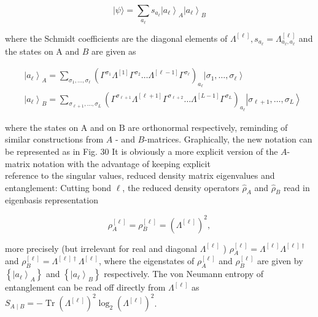 \documentclass[12pt]{article}
\begin{document}
\begin{equation*}
|\psi\rangle=\sum_{a_{\ell}} s_{a_{\ell}}\left|a_{\ell}\right\rangle_{A}\left|a_{\ell}\right\rangle_{B} \tag{157}
\end{equation*}


where the Schmidt coefficients are the diagonal elements of $\Lambda^{[\ell]}, s_{a_{\ell}}=\Lambda_{a_{\ell}, a_{\ell}}^{[\ell]}$ and the states on $\mathrm{A}$ and $B$ are given as


\begin{align*}
& \left|a_{\ell}\right\rangle_{A}=\sum_{\sigma_{1}, \ldots, \sigma_{\ell}}\left(\Gamma^{\sigma_{1}} \Lambda^{[1]} \Gamma^{\sigma_{2}} \ldots \Lambda^{[\ell-1]} \Gamma^{\sigma_{\ell}}\right)_{a_{\ell}}\left|\sigma_{1}, \ldots, \sigma_{\ell}\right\rangle  \tag{158}\\
& \left|a_{\ell}\right\rangle_{B}=\sum_{\sigma_{\ell+1}, \ldots, \sigma_{L}}\left(\Gamma^{\sigma_{\ell+1}} \Lambda^{[\ell+1]} \Gamma^{\sigma_{\ell+2}} \ldots \Lambda^{[L-1]} \Gamma^{\sigma_{L}}\right)_{a_{\ell}}\left|\sigma_{\ell+1}, \ldots, \sigma_{L}\right\rangle \tag{159}
\end{align*}


where the states on $\mathrm{A}$ and on $\mathrm{B}$ are orthonormal respectively, reminding of similar constructions from $A$ - and $B$-matrices. Graphically, the new notation can be represented as in Fig. 30 It is obviously a more explicit version of the $A$-matrix notation with the advantage of keeping explicit\\
reference to the singular values, reduced density matrix eigenvalues and entanglement: Cutting bond $\ell$, the reduced density operators $\hat{\rho}_{A}$ and $\hat{\rho}_{B}$ read in eigenbasis representation


\begin{equation*}
\rho_{A}^{[\ell]}=\rho_{B}^{[\ell]}=\left(\Lambda^{[\ell]}\right)^{2}, \tag{160}
\end{equation*}


more precisely (but irrelevant for real and diagonal $\Lambda^{[\ell]}$ ) $\rho_{A}^{[\ell]}=\Lambda^{[\ell]} \Lambda^{[\ell] \dagger}$ and $\rho_{B}^{[\ell]}=\Lambda^{[\ell] \dagger} \Lambda^{[\ell]}$, where the eigenstates of $\rho_{A}^{[\ell]}$ and $\rho_{B}^{[\ell]}$ are given by $\left\{\left|a_{\ell}\right\rangle_{A}\right\}$ and $\left\{\left|a_{\ell}\right\rangle_{B}\right\}$ respectively. The von Neumann entropy of entanglement can be read off directly from $\Lambda^{[\ell]}$ as $S_{A \mid B}=-\operatorname{Tr}\left(\Lambda^{[\ell]}\right)^{2} \log _{2}\left(\Lambda^{[\ell]}\right)^{2}$.
\end{document}

